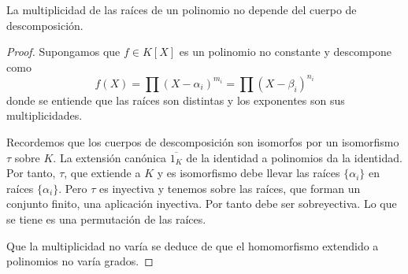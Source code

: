 \begin{proposition}
La multiplicidad de las raíces de un polinomio no depende del cuerpo de descomposición. 
\end{proposition}
\begin{proof}
Supongamos que $f \in K[X]$ es un polinomio no constante y descompone como $$f(X) = \prod (X - \alpha_i)^{m_i} = \prod (X - \beta_i)^{n_i}$$ donde se entiende que las raíces son distintas y los exponentes son sus multiplicidades. 

Recordemos que los cuerpos de descomposición son isomorfos por un isomorfismo $\tau$ sobre $K$. La extensión canónica $\overline{1_K}$ de la identidad a polinomios da la identidad. Por tanto, $\tau$, que extiende a $K$ y es isomorfismo debe llevar las raíces $\{\alpha_i \}$ en raíces $\{\alpha_i \}$. Pero $\tau$ es inyectiva y tenemos sobre las raíces, que forman un conjunto finito, una aplicación inyectiva. Por tanto debe ser sobreyectiva. Lo que se tiene es una permutación de las raíces. 

Que la multiplicidad no varía se deduce de que el homomorfismo extendido a polinomios no varía grados. 
\end{proof}


